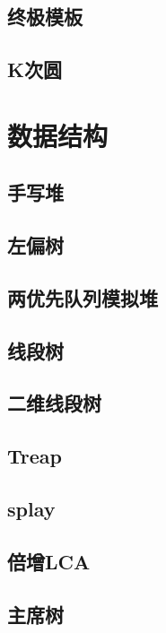 \documentclass{report}
\begin{document}
    \section{终极模板}
    
    \section{K次圆}
    
\chapter{数据结构}
    \section{手写堆}
        
    \section{左偏树}
        
    \section{两优先队列模拟堆}
        
    \section{线段树}
        
    \section{二维线段树}
        
    \section{Treap}
        
    \section{splay}
        
    \section{倍增LCA}
        
    \section{主席树}
        
\end{document}
